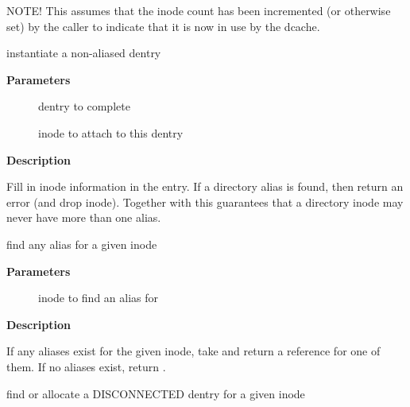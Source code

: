 \documentclass[a4paper,8pt,english]{sphinxmanual}
\begin{document}
NOTE! This assumes that the inode count has been incremented
(or otherwise set) by the caller to indicate that it is now
in use by the dcache.

\begin{fulllineitems}
\label{filesystems/index:c.d_instantiate_no_diralias}
instantiate a non-aliased dentry

\end{fulllineitems}


\textbf{Parameters}
\begin{description}
\item[{}] \leavevmode
dentry to complete

\item[{}] \leavevmode
inode to attach to this dentry

\end{description}

\textbf{Description}

Fill in inode information in the entry.  If a directory alias is found, then
return an error (and drop inode).  Together with  this
guarantees that a directory inode may never have more than one alias.

\begin{fulllineitems}
\label{filesystems/index:c.d_find_any_alias}
find any alias for a given inode

\end{fulllineitems}


\textbf{Parameters}
\begin{description}
\item[{}] \leavevmode
inode to find an alias for

\end{description}

\textbf{Description}

If any aliases exist for the given inode, take and return a
reference for one of them.  If no aliases exist, return .

\begin{fulllineitems}
\label{filesystems/index:c.d_obtain_alias}
find or allocate a DISCONNECTED dentry for a given inode

\end{fulllineitems}
\end{document}

